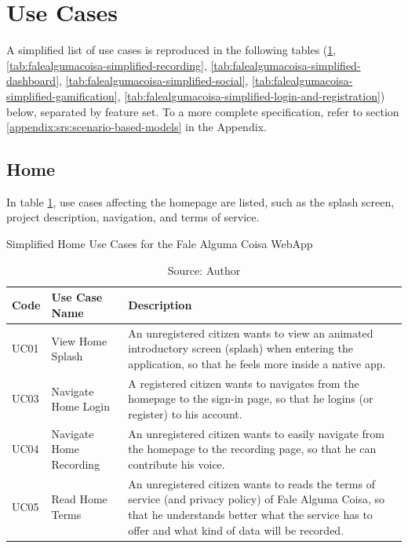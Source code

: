 \clearpage
\section{Use Cases}
\label{sec:simplified-use-cases}

A simplified list of use cases is reproduced in the following tables (\ref{tab:falealgumacoisa-simplified-home}, \ref{tab:falealgumacoisa-simplified-recording}, \ref{tab:falealgumacoisa-simplified-dashboard}, \ref{tab:falealgumacoisa-simplified-social}, \ref{tab:falealgumacoisa-simplified-gamification}, \ref{tab:falealgumacoisa-simplified-login-and-registration}) below, separated by feature set. To a more complete specification, refer to section \ref{appendix:srs:scenario-based-models} in the Appendix.

\subsection{Home}

In table \ref{tab:falealgumacoisa-simplified-home}, use cases affecting the homepage are listed, such as the splash screen, project description, navigation, and terms of service.

\begin{table}[h]
\caption{Simplified Home Use Cases for the Fale Alguma Coisa WebApp}
\label{tab:falealgumacoisa-simplified-home}
\centering
\begin{tabular}{|p{1cm}|p{3cm}|p{10cm}|}
\hline
    Code & Use Case Name & Description \\ \hline
    UC01 & View Home Splash & An unregistered citizen wants to view an animated introductory screen (splash) when entering the application, so that he feels more inside a native app. \\ \hline
    UC03 & Navigate Home Login & A registered citizen wants to navigates from the homepage to the sign-in page, so that he logins (or register) to his account. \\ \hline
    UC04 & Navigate Home Recording & An unregistered citizen wants to easily navigate from the homepage to the recording page, so that he can contribute his voice. \\ \hline
    UC05 & Read Home Terms & An unregistered citizen wants to reads the terms of service (and privacy policy) of Fale Alguma Coisa, so that he understands better what the service has to offer and what kind of data will be recorded. \\ \hline
\end{tabular}
\caption*{Source: Author}
\end{table}

